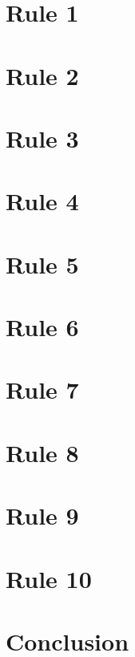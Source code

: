\documentclass[10pt,letterpaper]{article}
\newcommand{\rulemajor}[1]{\section{#1}}
\begin{document}
\rulemajor{Rule 1}

\rulemajor{Rule 2}

\rulemajor{Rule 3}

\rulemajor{Rule 4}

\rulemajor{Rule 5}

\rulemajor{Rule 6}

\rulemajor{Rule 7}

\rulemajor{Rule 8}

\rulemajor{Rule 9}

\rulemajor{Rule 10}

\section*{Conclusion}



\end{document}
